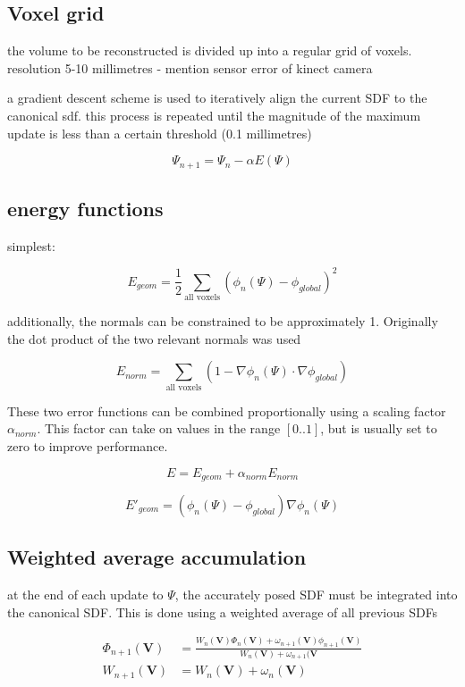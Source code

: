 \documentclass[12pt,twoside]{report}
\begin{document}
\subsection{Voxel grid}

the volume to be reconstructed is divided up into a regular grid of voxels. resolution 5-10 millimetres - mention sensor error of kinect camera

a gradient descent scheme is used to iteratively align the current SDF to the canonical sdf. this process is repeated until the magnitude of the maximum update is less than a certain threshold (0.1 millimetres)

$$\Psi_{n+1} = \Psi_n - \alpha E(\Psi)$$




\subsection{energy functions}

simplest:

$$ E_{geom} = \frac{1}{2} \sum\limits_{\textrm{all voxels}} (\phi_n(\Psi) - \phi_{global})^2  $$


additionally, the normals can be constrained to be approximately 1. Originally the dot product of the two relevant normals was used

$$ E_{norm} = \sum\limits_{\textrm{all voxels}}(1 - \nabla \phi_n(\Psi) \cdot \nabla\phi_{global}) $$

These two error functions can be combined proportionally using a scaling factor $\alpha_{norm}$. This factor can take on values in the range $[0..1]$, but is usually set to zero to improve performance.

$$E = E_{geom} + \alpha_{norm}E_{norm}$$

$$ E'_{geom} = (\phi_n(\Psi) - \phi_{global}) \nabla \phi_n(\Psi)$$

\subsection{Weighted average accumulation}

at the end of each update to $\Psi$, the accurately posed SDF must be integrated into the canonical SDF. This is done using a weighted average of all previous SDFs

\begin{align*}
\Phi_{n+1}(\textbf{V}) &= \frac{W_n(\textbf{V})\Phi_n(\textbf{V}) + \omega_{n+1}(\textbf{V})\phi_{n+1}(\textbf{V})}{W_{n}(\textbf{V}) + \omega_{n+1}(\textbf{V}}\\
W_{n+1}(\textbf{V}) &= W_n(\textbf{V}) + \omega_n(\textbf{V}) \\
\end{align*}
\end{document}
